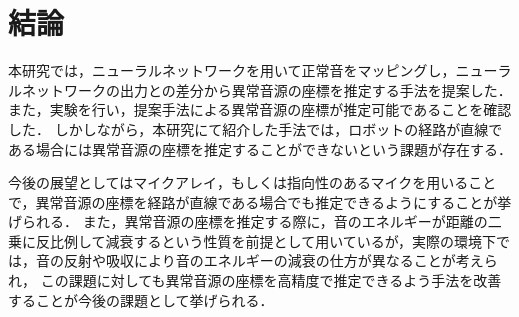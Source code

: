 \documentclass[../main]{subfiles}
\begin{document}
\graphicspath{{../figures}}

\section{結論}
本研究では，ニューラルネットワークを用いて正常音をマッピングし，ニューラルネットワークの出力との差分から異常音源の座標を推定する手法を提案した．
また，実験を行い，提案手法による異常音源の座標が推定可能であることを確認した．
しかしながら，本研究にて紹介した手法では，ロボットの経路が直線である場合には異常音源の座標を推定することができないという課題が存在する．


今後の展望としてはマイクアレイ，もしくは指向性のあるマイクを用いることで，異常音源の座標を経路が直線である場合でも推定できるようにすることが挙げられる．
また，異常音源の座標を推定する際に，音のエネルギーが距離の二乗に反比例して減衰するという性質を前提として用いているが，実際の環境下では，音の反射や吸収により音のエネルギーの減衰の仕方が異なることが考えられ，
この課題に対しても異常音源の座標を高精度で推定できるよう手法を改善することが今後の課題として挙げられる．
\end{document}
